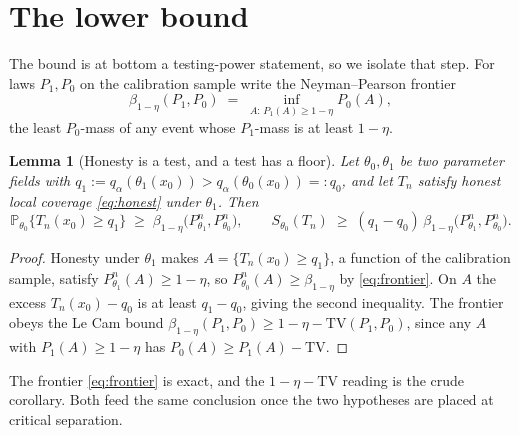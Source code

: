 \documentclass[11pt]{article}
\newtheorem{lemma}[theorem]{Lemma}
\theoremstyle{definition}
\theoremstyle{remark}
\newcommand{\Prob}{\mathbb{P}}
\newcommand{\TV}{\mathrm{TV}}
\begin{document}
\section{The lower bound}

The bound is at bottom a testing-power statement, so we isolate that step. For laws
$P_1,P_0$ on the calibration sample write the Neyman--Pearson frontier
\begin{equation}\label{eq:frontier}
  \beta_{1-\eta}(P_1,P_0) \;=\; \inf_{A:\,P_1(A)\ge 1-\eta} P_0(A) ,
\end{equation}
the least $P_0$-mass of any event whose $P_1$-mass is at least $1-\eta$.

\begin{lemma}[Honesty is a test, and a test has a floor]\label{lem:test}
Let $\theta_0,\theta_1$ be two parameter fields with $q_1 := q_\alpha(\theta_1(x_0)) >
q_\alpha(\theta_0(x_0)) =: q_0$, and let $T_n$ satisfy honest local coverage
\eqref{eq:honest} under $\theta_1$. Then
\[
  \Prob_{\theta_0}\big\{ T_n(x_0) \ge q_1 \big\}
    \;\ge\; \beta_{1-\eta}\big(P^n_{\theta_1},P^n_{\theta_0}\big) ,
  \qquad
  S_{\theta_0}(T_n) \;\ge\; (q_1-q_0)\,
    \beta_{1-\eta}\big(P^n_{\theta_1},P^n_{\theta_0}\big) .
\]
\end{lemma}

\begin{proof}
Honesty under $\theta_1$ makes $A=\{T_n(x_0)\ge q_1\}$, a function of the calibration
sample, satisfy $P^n_{\theta_1}(A)\ge 1-\eta$, so $P^n_{\theta_0}(A)\ge\beta_{1-\eta}$ by
\eqref{eq:frontier}. On $A$ the excess $T_n(x_0)-q_0$ is at least $q_1-q_0$, giving the
second inequality. The frontier obeys the Le Cam bound
$\beta_{1-\eta}(P_1,P_0)\ge 1-\eta-\TV(P_1,P_0)$, since any $A$ with $P_1(A)\ge1-\eta$ has
$P_0(A)\ge P_1(A)-\TV$.
\end{proof}

The frontier \eqref{eq:frontier} is exact, and the $1-\eta-\TV$ reading is the crude corollary.
Both feed the same conclusion once the two hypotheses are placed at critical separation.
\end{document}
